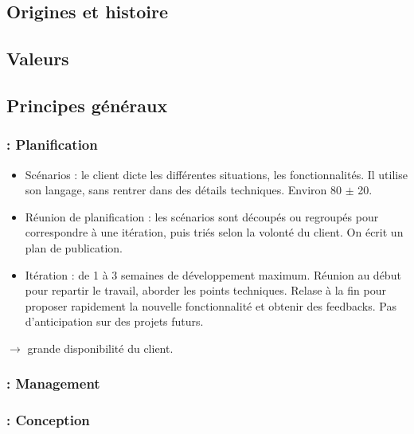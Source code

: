 \begin{frame}
\tableofcontents

\end{frame}
    
\subsection{Origines et histoire}
\begin{frame}
\frametitle{\insertsubsection}
\end{frame}

\subsection{Valeurs}
\begin{frame}
\frametitle{\insertsubsection}
\end{frame}

\subsection{Principes généraux}
\begin{frame}
\frametitle{\insertsubsection : Planification}
\begin{itemize}
\item Scénarios : le client dicte les différentes situations, les fonctionnalités. Il utilise son langage, sans rentrer dans des détails techniques. Environ 80 $\pm$ 20.
\item Réunion de planification : les scénarios sont découpés ou regroupés pour correspondre à une itération, puis triés selon la volonté du client. On écrit un plan de publication.
\item Itération : de 1 à 3 semaines de développement maximum. Réunion au début pour repartir le travail, aborder les points techniques. Relase à la fin pour proposer rapidement la nouvelle fonctionnalité et obtenir des feedbacks. Pas d'anticipation sur des projets futurs.
\end{itemize}
\begin{center}
$\longrightarrow$ grande disponibilité du client.
\end{center}
\end{frame}

\begin{frame}
\frametitle{\insertsubsection : Management}

\end{frame}

\begin{frame}
\frametitle{\insertsubsection : Conception}

\end{frame}

